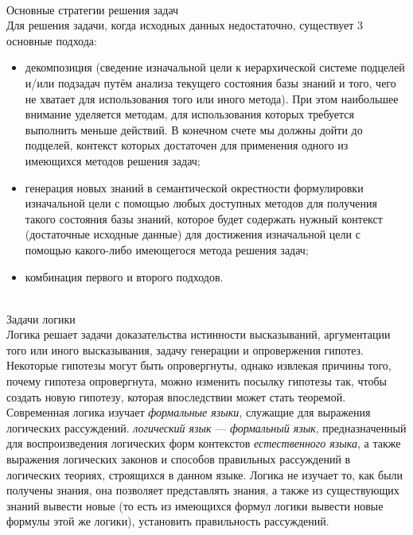 \begin{frame}{\\Основные стратегии решения задач}
\topline
\vspace{40pt}
 \\
 
        Для решения задачи, когда исходных данных недостаточно, существует 3 основные подхода:
        \begin{itemize}
            \item декомпозиция (сведение изначальной цели к иерархической системе подцелей и/или подзадач путём анализа текущего состояния базы знаний и того, чего не хватает для использования того или иного метода). При этом наибольшее внимание уделяется методам, для использования которых требуется выполнить меньше действий. В конечном счете мы должны дойти до подцелей, контекст которых достаточен для применения одного из имеющихся методов решения задач;
            \item генерация новых знаний в семантической окрестности формулировки изначальной цели с помощью любых доступных методов для получения такого состояния базы знаний, которое будет содержать нужный контекст (достаточные исходные данные) для достижения изначальной цели с помощью какого-либо имеющегося метода решения задач;
            \item комбинация первого и второго подходов.
        \end{itemize}
\end{frame}

\begin{frame}{\\Задачи логики}
\topline
\vspace{30pt}
 \\
 
        Логика решает задачи доказательства истинности высказываний, аргументации того или иного высказывания, задачу генерации и опровержения гипотез. Некоторые гипотезы могут быть опровергнуты, однако извлекая причины того, почему гипотеза опровергнута, можно изменить посылку гипотезы так, чтобы создать новую гипотезу, которая впоследствии может стать теоремой.
        Современная логика изучает \textit{формальные языки}, служащие для выражения логических рассуждений. \textit{логический язык} — \textit{формальный язык}, предназначенный для воспроизведения логических форм контекстов \textit{естественного языка}, а также выражения логических законов и способов правильных рассуждений в логических теориях, строящихся в данном языке. Логика не изучает то, как были получены знания, она позволяет представлять знания, а также из существующих знаний вывести новые (то есть из имеющихся формул логики вывести новые формулы этой же логики), установить правильность рассуждений.
\end{frame}

